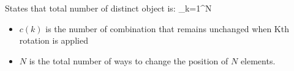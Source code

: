 States that total number of distinct object is: \sum_{k=1}^{N}             
\begin{itemize}
    \item $c(k)$ is the number of combination that remains unchanged when Kth rotation is applied
    \item $N$ is the total number of ways to change the position of $N$ elements.
\end{itemize}